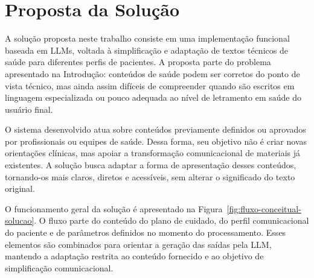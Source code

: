 \chapter{Proposta da Solução} 
\label{cap:proposta} 

A solução proposta neste trabalho consiste em uma implementação funcional baseada em LLMs, voltada à simplificação e adaptação de textos técnicos de saúde para diferentes perfis de pacientes. A proposta parte do problema apresentado na Introdução: conteúdos de saúde podem ser corretos do ponto de vista técnico, mas ainda assim difíceis de compreender quando são escritos em linguagem especializada ou pouco adequada ao nível de letramento em saúde do usuário final.

O sistema desenvolvido atua sobre conteúdos previamente definidos ou aprovados por profissionais ou equipes de saúde. Dessa forma, seu objetivo não é criar novas orientações clínicas, mas apoiar a transformação comunicacional de materiais já existentes. A solução busca adaptar a forma de apresentação desses conteúdos, tornando-os mais claros, diretos e acessíveis, sem alterar o significado do texto original. 

O funcionamento geral da solução é apresentado na Figura~\ref{fig:fluxo-conceitual-solucao}. O fluxo parte do conteúdo do plano de cuidado, do perfil comunicacional do paciente e de parâmetros definidos no momento do processamento. Esses elementos são combinados para orientar a geração das saídas pela LLM, mantendo a adaptação restrita ao conteúdo fornecido e ao objetivo de simplificação comunicacional.

